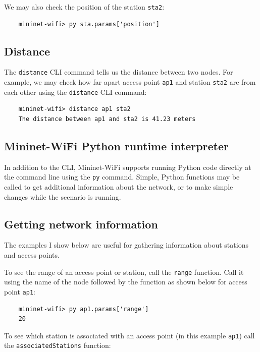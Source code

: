 We may also check the position of the station \texttt{sta2}:

\begin{verbatim}
    mininet-wifi> py sta.params['position']
\end{verbatim}
  
\subsection{Distance}

The \texttt{distance} CLI command tells us the distance between two nodes. For example, we may check how far apart access point \texttt{ap1} and station \texttt{sta2} are from each other using the \texttt{distance} CLI command:

\begin{verbatim}
    mininet-wifi> distance ap1 sta2        
    The distance between ap1 and sta2 is 41.23 meters
\end{verbatim}
       
\subsection{Mininet-WiFi Python runtime interpreter}

In addition to the CLI, Mininet-WiFi supports running Python code directly at the command line using the \texttt{py} command. Simple, Python functions may be called to get additional information about the network, or to make simple changes while the scenario is running.

\subsection{Getting network information}

The examples I show below are useful for gathering information about stations and access points.

To see the range of an access point or station, call the \texttt{range} function. Call it using the name of the node followed by the function as shown below for access point \texttt{ap1}:

\begin{verbatim}
    mininet-wifi> py ap1.params['range']
    20
\end{verbatim}
    
\noindent To see which station is associated with an access point (in this example \texttt{ap1}) call the \texttt{associatedStations} function:

